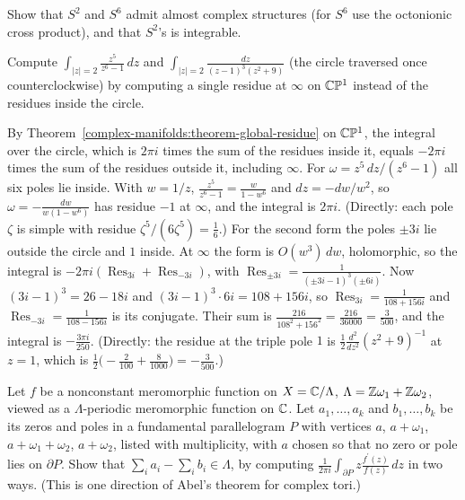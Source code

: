 \begin{exercise}\label{complex-manifolds:exercise-almost-complex-s6}
Show that $S^2$ and $S^6$ admit almost complex structures (for $S^6$ use the octonionic cross product), and that $S^2$'s is integrable.
\end{exercise}

\begin{exercise}\label{complex-manifolds:exercise-residue-infinity}
Compute $\int_{|z| = 2}\frac{z^5}{z^6 - 1}\,dz$ and $\int_{|z| = 2}\frac{dz}{(z - 1)^3(z^2 + 9)}$ (the circle traversed once counterclockwise) by computing a single residue at $\infty$ on $\mathbb{C}\mathbb{P}^1$ instead of the residues
inside the circle.
\end{exercise}

\begin{solution}
By Theorem~\ref{complex-manifolds:theorem-global-residue} on $\mathbb{C}\mathbb{P}^1$, the integral over the circle, which is $2\pi i$ times the sum of the residues inside it, equals $-2\pi i$ times the sum of the residues
outside it, including $\infty$. For $\omega = z^5\,dz/(z^6 - 1)$ all six poles lie inside. With $w = 1/z$, $\frac{z^5}{z^6 - 1} = \frac{w}{1 - w^6}$ and $dz = -dw/w^2$, so $\omega = -\frac{dw}{w(1 - w^6)}$ has residue $-1$
at $\infty$, and the integral is $2\pi i$. (Directly: each pole $\zeta$ is simple with residue $\zeta^5/(6\zeta^5) = \frac16$.) For the second form the poles $\pm3i$ lie outside the circle and $1$ inside. At
$\infty$ the form is $O(w^3)\,dw$, holomorphic, so the integral is $-2\pi i(\operatorname{Res}_{3i} + \operatorname{Res}_{-3i})$, with
$\operatorname{Res}_{\pm3i} = \frac{1}{(\pm3i - 1)^3(\pm6i)}$. Now $(3i - 1)^3 = 26 - 18i$ and $(3i - 1)^3 \cdot 6i = 108 + 156i$, so $\operatorname{Res}_{3i} = \frac{1}{108 + 156i}$ and
$\operatorname{Res}_{-3i} = \frac{1}{108 - 156i}$ is its conjugate. Their sum is $\frac{216}{108^2 + 156^2} = \frac{216}{36000} = \frac{3}{500}$, and the integral is $-\frac{3\pi i}{250}$. (Directly: the
residue at the triple pole $1$ is $\frac12\frac{d^2}{dz^2}(z^2 + 9)^{-1}$ at $z = 1$, which is $\frac12\bigl(-\frac{2}{100} + \frac{8}{1000}\bigr) = -\frac{3}{500}$.)
\end{solution}

\begin{exercise}\label{complex-manifolds:exercise-abel-torus}
Let $f$ be a nonconstant meromorphic function on $X = \mathbb{C}/\Lambda$, $\Lambda = \mathbb{Z}\omega_1 + \mathbb{Z}\omega_2$, viewed as a $\Lambda$-periodic meromorphic function on $\mathbb{C}$. Let $a_1, \ldots, a_k$ and $b_1, \ldots, b_k$ be
its zeros and poles in a fundamental parallelogram $P$ with vertices $a$, $a + \omega_1$, $a + \omega_1 + \omega_2$, $a + \omega_2$, listed with multiplicity, with $a$ chosen so that no zero or pole lies on
$\partial P$. Show that $\sum_ia_i - \sum_ib_i \in \Lambda$, by computing $\frac{1}{2\pi i}\int_{\partial P}z\frac{f^{\prime}(z)}{f(z)}\,dz$ in two ways. (This is one direction of Abel's theorem for complex tori.)
\end{exercise}

